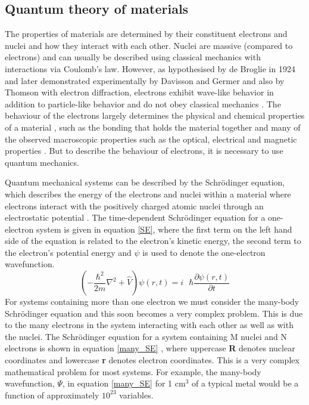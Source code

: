 \documentclass[11pt, twoside]{report}
\begin{document}
\subsection{Quantum theory of materials}


The properties of materials are determined by their constituent electrons and nuclei and how they interact with each other. Nuclei are massive (compared to electrons) and can usually be described using classical mechanics with interactions via Coulomb's law. However, as hypothesised by de Broglie in 1924 and later demonstrated experimentally by Davisson and Germer and also by Thomson with electron diffraction, electrons exhibit wave-like behavior in addition to particle-like behavior and do not obey classical mechanics \cite{quantum_intro}. The behaviour of the electrons largely determines the physical and chemical properties of a material \cite{Prasad_ch2}, such as the bonding that holds the material together and many of the observed macroscopic properties such as the optical, electrical and magnetic properties \cite{RichardMartin_Ch1}. But to describe the behaviour of electrons, it is necessary to use quantum mechanics.

Quantum mechanical systems can be described by the Schr{\"o}dinger equation, which describes the energy of the electrons and nuclei within a material where electrons interact with the positively charged atomic nuclei through an electrostatic potential \cite{Lesar}. The time-dependent Schr{\"o}dinger equation for a one-electron system is given in equation \ref{SE}, where the first term on the left hand side of the equation is related to the electron's kinetic energy, the second term to the electron's potential energy and $\psi$ is used to denote the one-electron wavefunction.
\begin{equation} \label{SE}
\left( - \frac{\hbar^2}{2m} \nabla^2 + \hat{V} \right)\psi(r,t) = i\text{ } \hbar\frac{\partial \psi(r,t)}{\partial t}
\end{equation}
For systems containing more than one electron we must consider the many-body Schr{\"o}dinger equation and this soon becomes a very complex problem. This is due to the many electrons in the system interacting with each other as well as with the nuclei. The Schr{\"o}dinger equation for a system containing M nuclei and N electrons is shown in equation \ref{many_SE} \cite{Lesar}, where uppercase \textbf{R} denotes nuclear coordinates and lowercase \textbf{r} denotes electron coordinates. This is a very complex mathematical problem for most systems. For example, the many-body wavefunction, $\Psi$, in equation \ref{many_SE} for 1 cm$^3$ of a typical metal would be a function of approximately $10^{23}$ variables.
\end{document}
